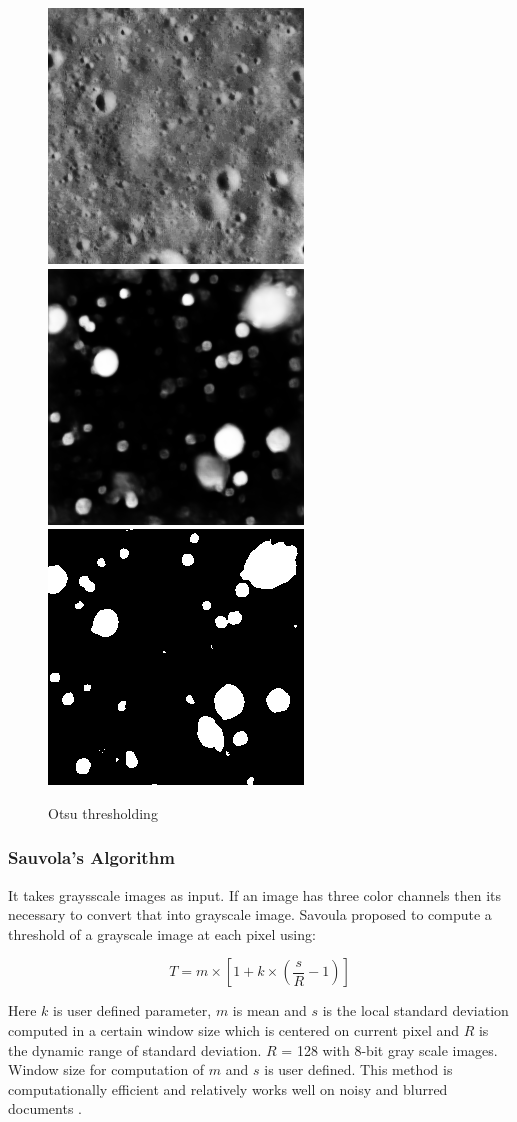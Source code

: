 \documentclass[11pt]{article}
\begin{document}
\begin{figure}[ht!]
	\includegraphics[width=.3\textwidth]{files/results/26.png}\hfill
	\includegraphics[width=.3\textwidth]{files/results/26_predict.png}\hfill
	\includegraphics[width=.3\textwidth]{files/results/otsu.png}
	\caption{Otsu thresholding}
	\label{otsu thresholding}
\end{figure}

\subsubsection{Sauvola's Algorithm}
It takes graysscale images as input. If an image has three color channels then its necessary to convert that into grayscale image. Savoula proposed to compute a threshold of a grayscale image at each pixel using:

\begin{equation}
T=m \times\left[1+k \times\left(\frac{s}{R}-1\right)\right]
\end{equation}

Here $k$ is user defined parameter, $m$ is mean and $s$ is the local standard deviation computed in a certain window size which is centered on current pixel and $R$ is the dynamic range of standard deviation. $R$ = 128 with 8-bit gray scale images. Window size for computation of $m$ and $s$ is user defined. This method is computationally efficient and relatively works well on noisy and blurred documents \cite{szegedy_going_2015}.
\end{document}
